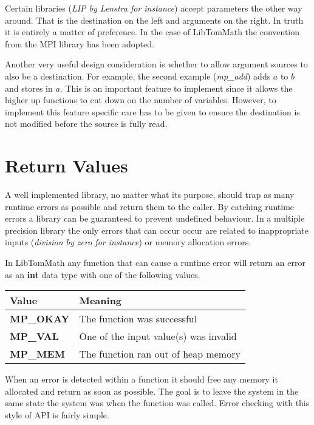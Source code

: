 \documentclass[b5paper]{book}
\begin{document}
Certain libraries (\textit{LIP by Lenstra for instance}) accept parameters the other way around.  That is the destination
on the left and arguments on the right.  In truth it is entirely a matter of preference.  In the case of LibTomMath the 
convention from the MPI library has been adopted.  

Another very useful design consideration is whether to allow argument sources to also be a destination.  For example, the
second example (\textit{mp\_add}) adds $a$ to $b$ and stores in $a$.  This is an important feature to implement since it
allows the higher up functions to cut down on the number of variables.  However, to implement this feature specific
care has to be given to ensure the destination is not modified before the source is fully read.

\section{Return Values}
A well implemented library, no matter what its purpose, should trap as many runtime errors as possible and return them to the 
caller.  By catching runtime errors a library can be guaranteed to prevent undefined behaviour.  In a multiple precision 
library the only errors that can occur occur are related to inappropriate inputs (\textit{division by zero for instance}) or 
memory allocation errors.

In LibTomMath any function that can cause a runtime error will return an error as an \textbf{int} data type with one of the 
following values.

  
\begin{center}
\begin{tabular}{|l|l|}
\hline \textbf{Value} & \textbf{Meaning} \\
\hline \textbf{MP\_OKAY} & The function was successful \\
\hline \textbf{MP\_VAL}  & One of the input value(s) was invalid \\
\hline \textbf{MP\_MEM}  & The function ran out of heap memory \\
\hline
\end{tabular}
\end{center}

When an error is detected within a function it should free any memory it allocated and return as soon as possible.  The goal
is to leave the system in the same state the system was when the function was called.  Error checking with this style of API is fairly simple.
\end{document}
